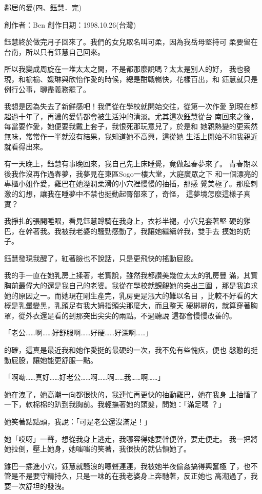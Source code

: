 鄰居的愛(四、鈺慧．完)

創作者：Ben
創作日期：1998.10.26(台灣)


鈺慧終於做完月子回來了。我們的女兒取名叫可柔，因為我岳母堅持可
柔要留在台南，所以只有鈺慧自己回來。

所以我變成周旋在一堆太太之間，不是都那麼說嗎？太太是別人的好，
我也發現，和榆榆、媛琳與欣怡作愛的時候，總是酣戰暢快，花樣百出，和
鈺慧就只是例行公事，聊盡義務罷了。

我想是因為失去了新鮮感吧！我們從在學校就開始交往，從第一次作愛
到現在都超過十年了，再濃的愛情都會被生活沖的清淡。尤其這次鈺慧從台
南回來之後，每當要作愛，她便要我戴上套子，我恨死那玩意兒了，於是和
她親熱變的更索然無味，常常作一半就沒有結果，我知道她不高興，這從她
生活上開始不和我親近就看得出來。

有一天晚上，鈺慧有事晚回來，我自己先上床睡覺，竟做起春夢來了。
青春期以後我作沒再作過春夢，我夢見在東區Sogo一樓大堂，大庭廣眾之下
和一個漂亮的專櫃小姐作愛，雞巴在她溼潤柔滑的小穴裡慢慢的抽插，那感
覺美極了。那麼刺激的幻想，讓我在睡夢中不禁也挺動起臀部來了，奇怪，
這夢境怎麼這樣子真實？

我掙扎的張開睡眼，看見鈺慧蹲騎在我身上，衣衫半褪，小穴兒套著堅
硬的雞巴，在幹著我。我被我老婆的騷勁感動了，我讓她繼續幹我，雙手去
摸她的奶子。

鈺慧發現我醒了，紅著臉也不說話，只是更飛快的搖動屁股。

我的手一直在她乳房上揉著，老實說，雖然我都讚美幾位太太的乳房豐
滿，其實胸前最偉大的還是我自己的老婆。我從在學校就覬覦她的突出三圍
，那是我追求她的原因之一。而她現在剛生產完，乳房更是漲大的難以名目
，比較不好看的大概是乳暈變黑，乳頭足有我大姆指頭尖那麼大，而且整天
硬梆梆的，就算穿著胸罩，從外衣還是看的到那突出尖尖的兩點。不過聽說
這都會慢慢改善的。

「老公……啊……好舒服啊……好硬……好深啊……」

的確，這真是最近我和她作愛挺的最硬的一次，我不免有些愧疚，便也
慇懃的挺動屁股，讓她能更舒服一點。

「啊呦……真好……好老公……啊……啊……我……啊……」

她在洩了，她高潮一向都很快的，我連忙再更快的抽動雞巴，她在我身
上抽慉了一下，軟棉棉的趴到我胸前。我輕撫著她的頭髮，問她：「滿足嗎
？」

她笑著點點頭，我說：「可是老公還沒滿足！」

她「哎呀」一聲，想從我身上逃走，我哪容得她要幹便幹，要走便走。
我一把將她拉倒，壓上她身，她嗤嗤的笑著，我很快的就佔領她了。

雞巴一插進小穴，鈺慧就騷浪的嗯聲連連，我被她半夜偷姦搞得興奮極
了，也不管是不是要守精持久，只是一味的在我老婆身上奔馳著，反正她也
高潮過了，我要一次舒坦的發洩。

